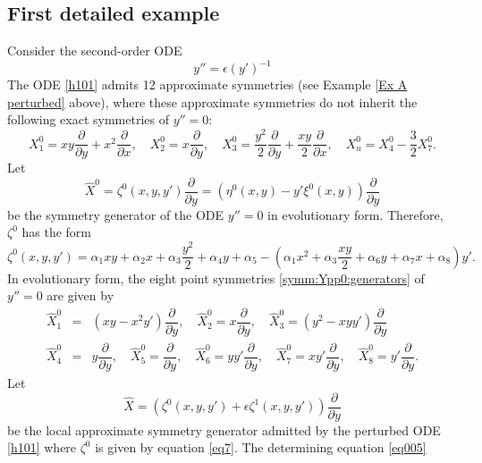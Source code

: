 \documentclass[11pt,letter,subeqn]{article}
\begin{document}
   \subsection{First detailed example}\label{sec:6:3}
  Consider the second-order ODE
  \begin{equation}\label{h101}
    y''=\epsilon {(y')^{-1}}
  \end{equation}
  The ODE \eqref{h101} admits 12 approximate symmetries (see Example \ref{Ex A perturbed} above), where these approximate symmetries do not inherit the following exact symmetries of $y''=0$:
  \[
     X_1^0 = xy\dfrac{\partial}{\partial y}+ x^2\dfrac{\partial}{\partial x},\quad X_2^0=x\dfrac{\partial}{\partial y},\quad X_3^0= \dfrac{y^2}{2}\dfrac{\partial}{\partial
     y}+\dfrac{xy}{2}\dfrac{\partial}{\partial x},\quad X^0_u= X^0_4-\dfrac{3}{2}X^0_7.
  \]
 Let
  \begin{equation}\label{local symm g}
    \hat{X}^{0}=\zeta^0(x,y,y')\dfrac{\partial}{\partial y}=\left(\eta^0(x,y)-y'\xi^0(x,y)\right)\dfrac{\partial}{\partial y}
  \end{equation}
  be the symmetry generator of the ODE $y''=0$ in {\textrm{evolutionary form}}. Therefore, $\zeta^0$ has the form
   \begin{equation}\label{eq7}
     \zeta^0(x,y,y')=\alpha_1xy+\alpha_2 x+\alpha_3\dfrac{y^2}{2}+\alpha_4y+\alpha_5- (\alpha_1x^2+\alpha_3\dfrac{xy}{2}+\alpha_6y+\alpha_7x+\alpha_8)y'.
   \end{equation}
   In {\textrm{evolutionary form}}, the eight point symmetries \eqref{symm:Ypp0:generators} of $y''=0$  are given by
   \begin{eqnarray}\label{r11evol}
     \nonumber %
      \hat{X}^{0}_1 &=& \left(xy-x^2y'\right)\dfrac{\partial}{\partial y},\quad \hat{X}^{0}_2=x\dfrac{\partial}{\partial y},\quad
      \hat{X}^{0}_3=\left({y^2-xyy'}\right)\dfrac{\partial}{\partial y} \\
      \hat{X}^{0}_4 &=& y\dfrac{\partial}{\partial y},\quad \hat{X}^{0}_5=\dfrac{\partial}{\partial y},\quad \hat{X}^{0}_6= yy'\dfrac{\partial}{\partial y},\quad \hat{X}^{0}_7=
      xy'\dfrac{\partial}{\partial y},\quad \hat{X}^{0}_8= y'\dfrac{\partial}{\partial y}.
    \end{eqnarray}
   Let
   \begin{equation}\label{ap1}
     \hat{X} =\left(\zeta^0(x,y,y')+\epsilon \zeta^1(x,y,y')\right)\dfrac{\partial}{\partial y}
   \end{equation}
   be the local approximate symmetry generator admitted by the perturbed ODE \eqref{h101} where $\zeta^0$ is given by equation \eqref{eq7}. The determining equation \eqref{eq005}
\end{document}
